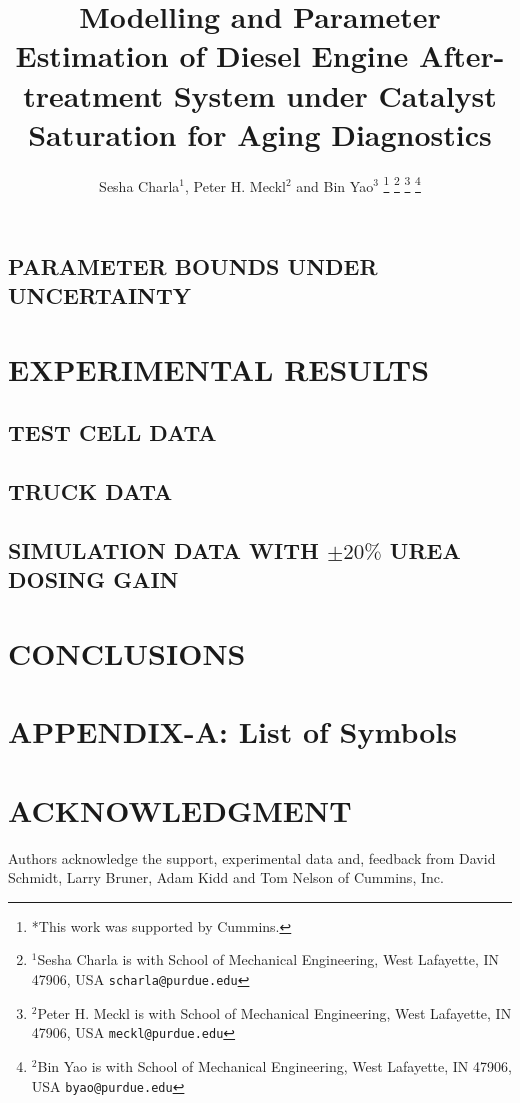 \documentclass[letterpaper, 10 pt, conference]{ieeeconf}  %
\title{\LARGE \bf
Modelling and Parameter Estimation of Diesel Engine After-treatment System under Catalyst Saturation for Aging Diagnostics
}
\author{Sesha Charla$^{1}$, Peter H. Meckl$^{2}$ and Bin Yao$^{3}$ %
\thanks{*This work was supported by Cummins.}%
\thanks{$^{1}$Sesha Charla is with School of Mechanical Engineering, West Lafayette, IN 47906, USA
        {\tt\small scharla@purdue.edu}}%
\thanks{$^{2}$Peter H. Meckl is with School of Mechanical Engineering, West Lafayette, IN 47906, USA
        {\tt\small meckl@purdue.edu}}%
\thanks{$^{2}$Bin Yao is with School of Mechanical Engineering, West Lafayette, IN 47906, USA
        {\tt\small byao@purdue.edu}}%
}
\begin{document}
\maketitle
\thispagestyle{empty}
\pagestyle{empty}


\begin{abstract}

\end{abstract}






\subsection{PARAMETER BOUNDS UNDER UNCERTAINTY}

\section{EXPERIMENTAL RESULTS}
\subsection{TEST CELL DATA}
\subsection{TRUCK DATA}
\subsection{SIMULATION DATA WITH $\pm 20\%$ UREA DOSING GAIN}

\section{CONCLUSIONS}

\newpage
\section*{APPENDIX-A: List of Symbols}


\section*{ACKNOWLEDGMENT}
Authors acknowledge the support, experimental data and, feedback from David Schmidt, Larry
Bruner, Adam Kidd and Tom Nelson of Cummins, Inc.



\end{document}
